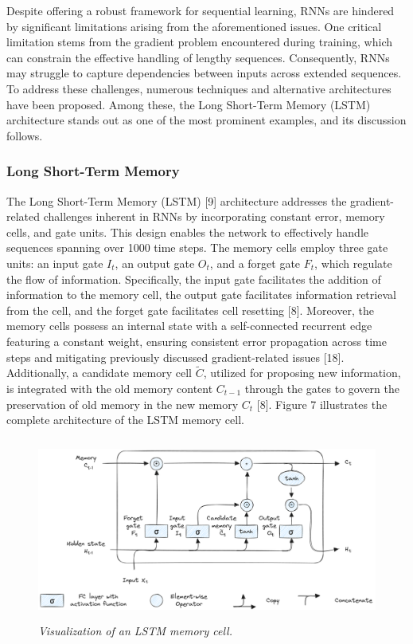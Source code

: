 Despite offering a robust framework for sequential learning, RNNs are hindered by significant limitations arising from the aforementioned issues. One critical limitation stems from the gradient problem encountered during training, which can constrain the effective handling of lengthy sequences. Consequently, RNNs may struggle to capture dependencies between inputs across extended sequences. To address these challenges, numerous techniques and alternative architectures have been proposed. Among these, the Long Short-Term Memory (LSTM) architecture stands out as one of the most prominent examples, and its discussion follows.

\subsubsection*{Long Short-Term Memory}

The Long Short-Term Memory (LSTM) [9] architecture addresses the gradient-related challenges inherent in RNNs by incorporating constant error, memory cells, and gate units. This design enables the network to effectively handle sequences spanning over 1000 time steps. The memory cells employ three gate units: an input gate \(I_t\), an output gate \(O_t\), and a forget gate \(F_t\), which regulate the flow of information. Specifically, the input gate facilitates the addition of information to the memory cell, the output gate facilitates information retrieval from the cell, and the forget gate facilitates cell resetting [8]. Moreover, the memory cells possess an internal state with a self-connected recurrent edge featuring a constant weight, ensuring consistent error propagation across time steps and mitigating previously discussed gradient-related issues [18]. Additionally, a candidate memory cell \(\tilde{C}\), utilized for proposing new information, is integrated with the old memory content \(C_{t-1}\) through the gates to govern the preservation of old memory in the new memory \(C_t\) [8]. Figure 7 illustrates the complete architecture of the LSTM memory cell.

\begin{figure}[H]
    \centering
    \includegraphics[width=\textwidth,height=6cm,keepaspectratio=true]{lstm.png}
    \caption{
        \it{Visualization of an LSTM memory cell.}
    }
    \label{fig:lstm}
\end{figure}

